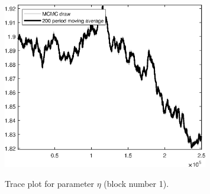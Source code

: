 \begin{figure}[H]
\centering
  \includegraphics[width=0.8\textwidth]{BRS_imp_mobility_alt/graphs/TracePlot_eta_blck_1}\\
    \caption{Trace plot for parameter ${\eta}$ (block number 1).}
\end{figure}
